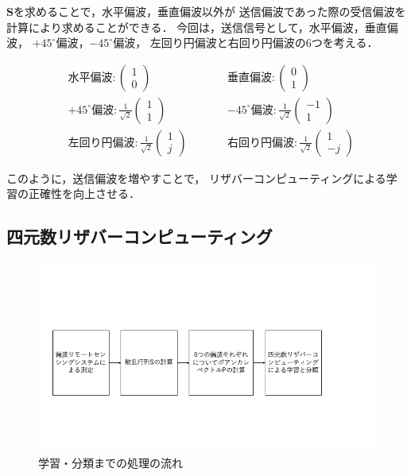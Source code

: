 \documentclass[uplatex,a4paper,10pt]{jsarticle}
\begin{document}
$\bm{S}$を求めることで，水平偏波，垂直偏波以外が
送信偏波であった際の受信偏波を計算により求めることができる．
今回は，送信信号として，水平偏波，垂直偏波，
$+45^\circ$偏波，$-45^\circ$偏波，
左回り円偏波と右回り円偏波の6つを考える．

\begin{align*}
    &水平偏波: \left(
        \begin{array}{c}
            1 \\
            0
        \end{array}
        \right) \qquad
    &&垂直偏波: \left(
        \begin{array}{c}
            0 \\
            1
        \end{array}
        \right)\\
    &+45^\circ 偏波: \frac{1}{\sqrt{2}}\left(
        \begin{array}{c}
            1 \\
            1
        \end{array}
        \right) \qquad
    &&-45^\circ 偏波: \frac{1}{\sqrt{2}}\left(
        \begin{array}{c}
            -1 \\
            1
        \end{array}
    \right)\\
    &左回り円偏波: \frac{1}{\sqrt{2}}\left(
        \begin{array}{c}
            1 \\
            j
        \end{array}
        \right) \qquad
    &&右回り円偏波: \frac{1}{\sqrt{2}}\left(
        \begin{array}{c}
            1 \\
            -j
        \end{array}
        \right)
\end{align*}

このように，送信偏波を増やすことで，
リザバーコンピューティングによる学習の正確性を向上させる．

\subsection{四元数リザバーコンピューティング}
\begin{figure}[hbtp]
	\centering
	\includegraphics[scale=0.4]{../img/process.png}
    \caption{学習・分類までの処理の流れ}
	\label{fig:process}
\end{figure}
\end{document}
